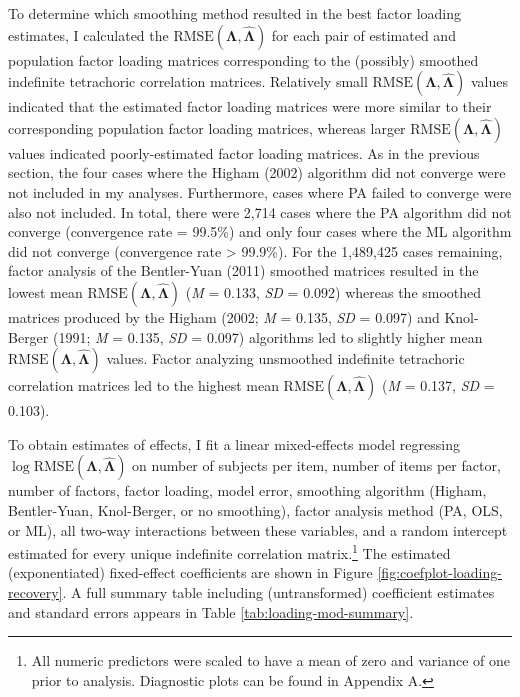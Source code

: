 \documentclass[
  english,
  man]{apa6}
\begin{document}
To determine which smoothing method resulted in the best factor loading estimates, I calculated the \(\textrm{RMSE}(\mathbf{\Lambda}, \hat{\mathbf{\Lambda}})\) for each pair of estimated and population factor loading matrices corresponding to the (possibly) smoothed indefinite tetrachoric correlation matrices. Relatively small \(\textrm{RMSE}(\mathbf{\Lambda}, \hat{\mathbf{\Lambda}})\) values indicated that the estimated factor loading matrices were more similar to their corresponding population factor loading matrices, whereas larger \(\textrm{RMSE}(\mathbf{\Lambda}, \hat{\mathbf{\Lambda}})\) values indicated poorly-estimated factor loading matrices. As in the previous section, the four cases where the Higham (2002) algorithm did not converge were not included in my analyses. Furthermore, cases where PA failed to converge were also not included. In total, there were 2,714 cases where the PA algorithm did not converge (convergence rate = 99.5\%) and only four cases where the ML algorithm did not converge (convergence rate \textgreater{} 99.9\%). For the 1,489,425 cases remaining, factor analysis of the Bentler-Yuan (2011) smoothed matrices resulted in the lowest mean \(\textrm{RMSE}(\mathbf{\Lambda}, \hat{\mathbf{\Lambda}})\) (\emph{M} = 0.133, \emph{SD} = 0.092) whereas the smoothed matrices produced by the Higham (2002; \emph{M} = 0.135, \emph{SD} = 0.097) and Knol-Berger (1991; \emph{M} = 0.135, \emph{SD} = 0.097) algorithms led to slightly higher mean \(\textrm{RMSE}(\mathbf{\Lambda}, \hat{\mathbf{\Lambda}})\) values. Factor analyzing unsmoothed indefinite tetrachoric correlation matrices led to the highest mean \(\textrm{RMSE}(\mathbf{\Lambda}, \hat{\mathbf{\Lambda}})\) (\emph{M} = 0.137, \emph{SD} = 0.103).

To obtain estimates of effects, I fit a linear mixed-effects model regressing \(\log \textrm{RMSE}(\mathbf{\Lambda}, \hat{\mathbf{\Lambda}})\) on number of subjects per item, number of items per factor, number of factors, factor loading, model error, smoothing algorithm (Higham, Bentler-Yuan, Knol-Berger, or no smoothing), factor analysis method (PA, OLS, or ML), all two-way interactions between these variables, and a random intercept estimated for every unique indefinite correlation matrix.\footnote{All numeric predictors were scaled to have a mean of zero and variance of one prior to analysis. Diagnostic plots can be found in Appendix A.} The estimated (exponentiated) fixed-effect coefficients are shown in Figure \ref{fig:coefplot-loading-recovery}. A full summary table including (untransformed) coefficient estimates and standard errors appears in Table \ref{tab:loading-mod-summary}.
\end{document}
